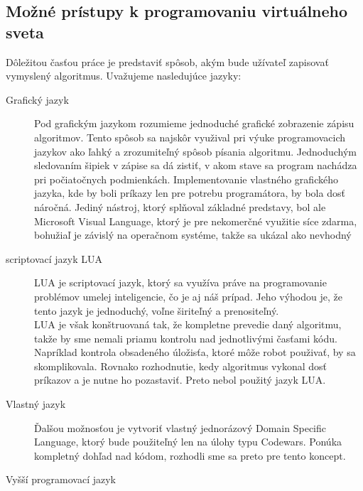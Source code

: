 \subsection{Možné prístupy k programovaniu virtuálneho sveta}
Dôležitou časťou práce je predstaviť spôsob, akým bude užívateľ zapisovať vymyslený algoritmus. Uvažujeme nasledujúce jazyky: %
\begin{description}
\item [Grafický jazyk] \hfill \newline
Pod grafickým jazykom rozumieme jednoduché grafické zobrazenie zápisu algoritmov. Tento spôsob sa najskôr využival pri výuke programovacich jazykov ako ľahký a zrozumiteľný spôsob písania algoritmu. Jednoduchým sledovaním šipiek v zápise sa dá zistiť, v akom stave sa program nachádza pri počiatočnych podmienkách. %
Implementovanie vlastného grafického jazyka, kde by boli príkazy len pre potrebu programátora, by bola dosť náročná. Jediný nástroj, ktorý splňoval základné predstavy, bol ale Microsoft Visual Language\cite{msvl}, ktorý je pre nekomerčné využitie síce zdarma, bohužiaľ je závislý na operačnom systéme, takže sa ukázal ako nevhodný \\ 
\item [scriptovací jazyk LUA]\hfill \newline
LUA\cite{lua} je scriptovací jazyk, ktorý sa využíva práve na programovanie problémov umelej inteligencie, čo je aj náš prípad. Jeho výhodou je, že tento jazyk je jednoduchý, voľne širiteľný a prenositeľný. \\
LUA je však konštruovaná tak, že kompletne prevedie daný algoritmu, takže by sme nemali priamu kontrolu nad jednotlivými časťami kódu. Napríklad kontrola obsadeného úložisťa, ktoré môže robot použivať, by sa skomplikovala. Rovnako rozhodnutie, kedy algoritmus vykonal dosť príkazov a je nutne ho pozastaviť. Preto nebol použitý jazyk LUA.
\item [Vlastný jazyk]\hfill \newline
Ďalšou možnosťou je vytvoriť vlastný jednorázový Domain Specific Language, ktorý bude použiteľný len na úlohy typu Codewars. Ponúka kompletný dohľad nad kódom, rozhodli sme sa preto pre tento koncept.
\item[Vyšší programovací jazyk]\hfill \newline
\end{description} %
